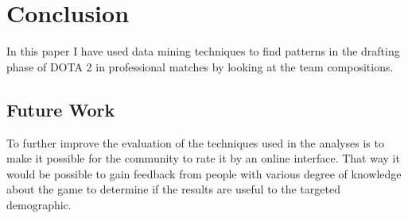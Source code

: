 \documentclass[result.tex]{subfiles}
\begin{document}
\section*{\centering Conclusion}

In this paper I have used data mining techniques to find patterns in the drafting phase of DOTA 2 in professional matches by looking at the team compositions.

\subsection*{Future Work}

To further improve the evaluation of the techniques used in the analyses is to make it possible for the community to rate it by an online interface. That way it would be possible to gain feedback from people with various degree of knowledge about the game to determine if the results are useful to the targeted demographic.
\end{document}
